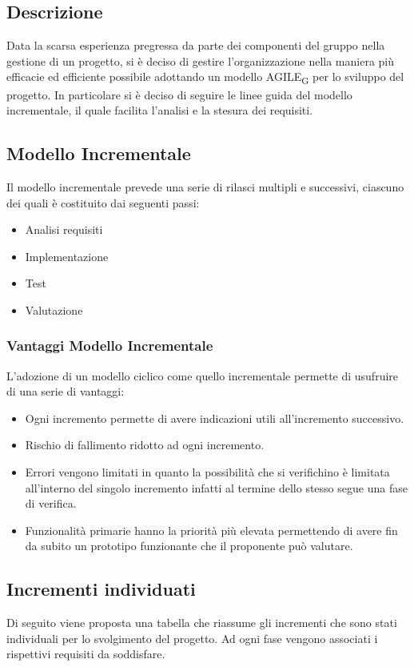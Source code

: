 \subsection{Descrizione}
Data la scarsa esperienza pregressa da parte dei componenti del gruppo nella gestione di un progetto, si è deciso di gestire l'organizzazione nella maniera più efficacie ed efficiente possibile adottando un modello AGILE\textsubscript{G} per lo sviluppo del progetto. In particolare si è deciso di seguire le linee guida del modello incrementale, il quale facilita l'analisi e la stesura dei requisiti. 
\subsection{Modello Incrementale}
Il modello incrementale prevede una serie di rilasci multipli e successivi, ciascuno dei quali è costituito dai seguenti passi: 
\begin{itemize}
    \item Analisi requisiti
    \item Implementazione
    \item Test 
    \item Valutazione
\end{itemize}
\subsubsection{Vantaggi Modello Incrementale}
L'adozione di un modello ciclico come quello incrementale permette di usufruire di una serie di vantaggi: 
\begin{itemize}
    \item Ogni incremento permette di avere indicazioni utili all'incremento successivo.
    \item Rischio di fallimento ridotto ad ogni incremento.
    \item Errori vengono limitati in quanto la possibilità che si verifichino è limitata all'interno del singolo incremento infatti al termine dello stesso segue una fase di verifica.
    \item Funzionalità primarie hanno la priorità più elevata permettendo di avere fin da subito un prototipo funzionante che il proponente può valutare.
\end{itemize}
\subsection{Incrementi individuati}
Di seguito viene proposta una tabella che riassume gli incrementi che sono stati individuali per lo svolgimento del progetto. Ad ogni fase vengono associati i rispettivi requisiti da soddisfare. 

